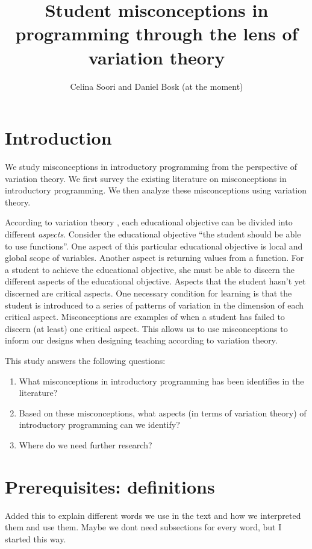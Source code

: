 \documentclass[twocolumn]{article}
\title{Student misconceptions in programming through the lens of variation 
theory}
\author{Celina Soori and Daniel Bosk (at the moment)}
\begin{document}
\maketitle
\tableofcontents

\section{Introduction}

We study misconceptions in introductory programming from the perspective of 
variation theory.
We first survey the existing literature on misconceptions in introductory 
programming.
We then analyze these misconceptions using variation theory.

According to variation theory \parencite[Ch.~2]{NCOL}, each educational 
objective can be divided into different \emph{aspects}.
Consider the educational objective \enquote{the student should be able to use 
functions}.
One aspect of this particular educational objective is local and global scope 
of variables.
Another aspect is returning values from a function.
For a student to achieve the educational objective, she must be able to discern 
the different aspects of the educational objective.
Aspects that the student hasn't yet discerned are critical aspects.
One necessary condition for learning is that the student is introduced to a 
series of patterns of variation in the dimension of each critical aspect.
Misconceptions are examples of when a student has failed to discern (at least) 
one critical aspect.
This allows us to use misconceptions to inform our designs when designing 
teaching according to variation theory.

This study answers the following questions:
\begin{enumerate}
  \item What misconceptions in introductory programming has been identifies in 
    the literature?
  \item Based on these misconceptions, what aspects (in terms of variation 
    theory) of introductory programming can we identify?
  \item Where do we need further research?
\end{enumerate}


\section{Prerequisites: definitions}

Added this to explain different words we use in the text and how we interpreted them and use them. Maybe we dont need subsections for every word, but I started this way.
\end{document}
